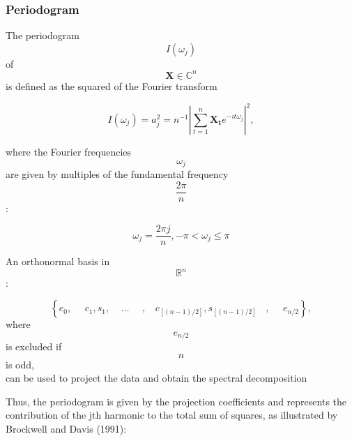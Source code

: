\documentclass[
]{book}
\begin{document}
\hypertarget{periodogram}{%
\subsubsection{Periodogram}\label{periodogram}}

The periodogram \[ I(\omega_j)\] of \[ \mathbf{X} \in \mathbb{C}^n \] is defined as the squared of the Fourier transform

\[
I(\omega_{j})=a_{j}^{2}=n^{-1}\left| \sum_{t=1}^{n}\mathbf{X_t} e^{-it\omega_j} \right|^{2},
\]

where the Fourier frequencies \[ \omega_{j} \] are given by multiples of the fundamental frequency \[ \frac{2\pi}{n} \]:

\[
\omega_{j}= \frac{2\pi j}{n}, -\pi < \omega_{j} \leq \pi 
\]

An orthonormal basis in \[ \mathbb{R}^n \]:

\[ 
\left\{ e_0, ~~~~~~c_1, s_1, ~~~~~\ldots~~~~~\ , ~~~~c_{[(n-1)/2]}, s_{[(n-1)/2]}~~~~,~~~~~~ e_{n/2}  \right\},
\]
where \[ e_{n/2} \] is excluded if \[ n \] is odd,\\
can be used to project the data and obtain the spectral decomposition

Thus, the periodogram is given by the projection coefficients and represents the contribution of the jth
harmonic to the total sum of squares, as illustrated by Brockwell and Davis (1991):
\end{document}
